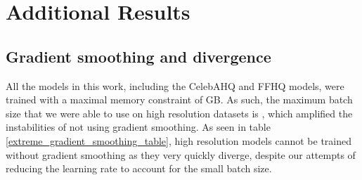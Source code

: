 \documentclass{article}
\begin{document}
\begin{table}[]
\caption{Layers distribution by resolution. A single integer in the width column means that width was kept constant for the entire model (outside of the bottleneck residual blocks).}
\label{layer_dist}
\end{table}

\section{Additional Results}
\subsection{Gradient smoothing and divergence}\label{extreme_gradient_smoothing}
All the models in this work, including the CelebAHQ  and FFHQ  models, were trained with a maximal memory constraint of GB. As such, the maximum batch size that we were able to use on high resolution datasets is , which amplified the instabilities of not using gradient smoothing. As seen in table \ref{extreme_gradient_smoothing_table}, high resolution models cannot be trained without gradient smoothing as they very quickly diverge, despite our attempts of reducing the learning rate to account for the small batch size.
\end{document}
